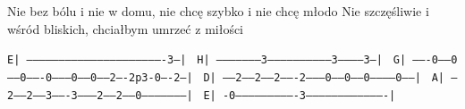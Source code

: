\documentclass[../../../songbook.tex]{subfiles}
\begin{document}
Nie bez bólu i nie w domu, nie chcę szybko i nie chcę młodo				 \newline
Nie szczęśliwie i wśród bliskich, chciałbym umrzeć z miłości				 \newline

 \texttt{E| ----------------------------------------------------------------3---| }	\newline
 \texttt{H| ---------------------3------------------------------3-----------3---| }	\newline
 \texttt{G| -------0-----0-----0-------0--------0------0------2----2p3-0----2---| }	\newline
 \texttt{D| -----2-----2-----2-------2--------0------0------0------------0------| }	\newline
 \texttt{A| ---2-----2-----3-------3--------2------2------0---------------------| }	\newline
 \texttt{E| -0----------------------------3-------------------------------------| }
 
\end{document}
